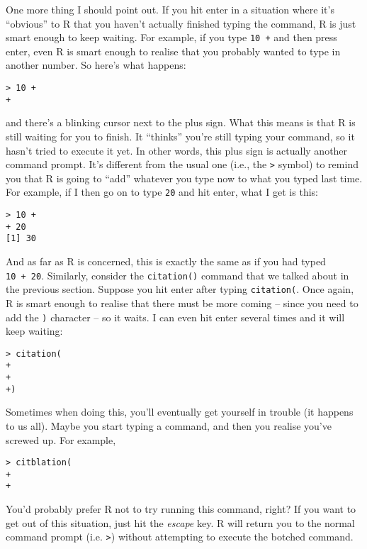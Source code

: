 \documentclass[]{book}
\begin{document}
One more thing I should point out. If you hit enter in a situation where it's ``obvious'' to R that you haven't actually finished typing the command, R is just smart enough to keep waiting. For example, if you type \texttt{10\ +} and then press enter, even R is smart enough to realise that you probably wanted to type in another number. So here's what happens:

\begin{verbatim}
> 10 +
+
\end{verbatim}

and there's a blinking cursor next to the plus sign. What this means is that R is still waiting for you to finish. It ``thinks'' you're still typing your command, so it hasn't tried to execute it yet. In other words, this plus sign is actually another command prompt. It's different from the usual one (i.e., the \texttt{\textgreater{}} symbol) to remind you that R is going to ``add'' whatever you type now to what you typed last time. For example, if I then go on to type \texttt{20} and hit enter, what I get is this:

\begin{verbatim}
> 10 +
+ 20
[1] 30
\end{verbatim}

And as far as R is concerned, this is exactly the same as if you had typed \texttt{10\ +\ 20}. Similarly, consider the \texttt{citation()} command that we talked about in the previous section. Suppose you hit enter after typing \texttt{citation(}. Once again, R is smart enough to realise that there must be more coming -- since you need to add the \texttt{)} character -- so it waits. I can even hit enter several times and it will keep waiting:

\begin{verbatim}
> citation( 
+
+
+)
\end{verbatim}

Sometimes when doing this, you'll eventually get yourself in trouble (it happens to us all). Maybe you start typing a command, and then you realise you've screwed up. For example,

\begin{verbatim}
> citblation(
+
+
\end{verbatim}

You'd probably prefer R not to try running this command, right? If you want to get out of this situation, just hit the \emph{escape} key. R will return you to the normal command prompt (i.e. \texttt{\textgreater{}}) without attempting to execute the botched command.
\end{document}
